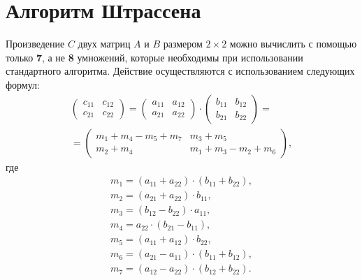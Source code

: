 \section{Алгоритм Штрассена}
Произведение $C$ двух матриц $A$ и $B$ размером $2 \times 2$ можно вычислить с помощью только \textbf{7}, а не \textbf{8} умножений, которые необходимы при использовании стандартного алгоритма.
Действие осуществляются с использованием следующих формул:
\begin{equation}
    \label{eq:strassen_1}
    \begin{gathered}
        \begin{pmatrix}
            c_{11} & c_{12} \\
            c_{21} & c_{22} 
        \end{pmatrix}
        = 
        \begin{pmatrix}
            a_{11} & a_{12} \\
            a_{21} & a_{22} 
        \end{pmatrix}
        \cdot
        \begin{pmatrix}
            b_{11} & b_{12} \\
            b_{21} & b_{22} 
        \end{pmatrix}
        = \\ =
        \begin{pmatrix}
            m_{1} + m_{4} - m_{5} + m_{7} & m_{3} + m_{5} \\
            m_{2} + m_{4} &m_{1} + m_{3} - m_{2} + m_{6}
        \end{pmatrix},
    \end{gathered}
\end{equation}
где
\begin{equation}
    \begin{gathered}
        m_{1} = (a_{11} + a_{22}) \cdot (b_{11} + b_{22}), \\
        m_{2} = (a_{21} + a_{22}) \cdot b_{11}, \\
        m_{3} = (b_{12} - b_{22}) \cdot a_{11}, \\
        m_{4} = a_{22} \cdot (b_{21} - b_{11}), \\
        m_{5} = (a_{11} + a_{12}) \cdot b_{22}, \\
        m_{6} = (a_{21} - a_{11}) \cdot (b_{11} + b_{12}), \\
        m_{7} = (a_{12} - a_{22}) \cdot (b_{12} + b_{22}).
    \end{gathered}
\end{equation}

